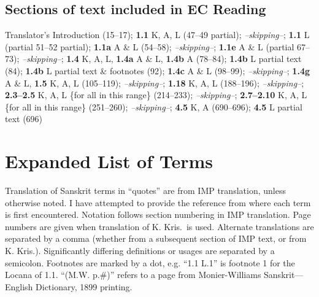 \documentclass[10pt]{article}
\begin{document}
\subsection{Sections of text included in EC Reading}

Translator's Introduction (15--17);
\textbf{1.1} K, A, L (47--49 partial);
\textit{--skipping--};
\textbf{1.1} L (partial 51--52 partial);
\textbf{1.1a} A \& L (54--58);
\textit{--skipping--};
\textbf{1.1e} A \& L (partial 67--73);
\textit{--skipping--};
\textbf{1.4} K, A, L, \textbf{1.4a} A \& L, \textbf{1.4b} A (78--84);
\textbf{1.4b} L partial text (84);
\textbf{1.4b} L partial text \& footnotes (92);
\textbf{1.4c} A \& L (98--99);
\textit{--skipping--};
\textbf{1.4g} A \& L, \textbf{1.5} K, A, L (105--119);
\textit{--skipping--};
\textbf{1.18} K, A, L (188--196);
\textit{--skipping--};
\textbf{2.3--2.5} K, A, L \{for all in this range\} (214--233);
\textit{--skipping--};
\textbf{2.7--2.10} K, A, L \{for all in this range\} (251--260);
\textit{--skipping--};
\textbf{4.5} K, A (690--696);
\textbf{4.5} L partial text (696)



\newpage


\section{Expanded List of Terms}

Translation of Sanskrit terms in ``quotes'' are from IMP translation, unless otherwise noted.
I have attempted to provide the reference from where each term is first encountered.
Notation follows section numbering in IMP translation. Page numbers are given when translation of K. Kris.\ is used.
Alternate translations are separated by a comma (whether from a subsequent section of IMP text, or from K. Kris.).
Significantly differing definitions or usages are separated by a semicolon.
Footnotes are marked by a dot, e.g. ``1.1 L.1'' is footnote 1 for the Locana of 1.1.
``(M.W. p.\#)'' refers to a page from Monier-Williams Sanskrit---English Dictionary, 1899 printing.



\newcommand\litem[1]{\item{\bfseries #1\label{#1}}}
\end{document}
